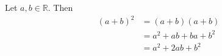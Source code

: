 Let $a, b \in \mathbb{R}$.
Then
\begin{align*}
  (a + b)^{2} &= (a + b)(a + b) \tag*{definition} \\
  &= a^{2} + ab + ba + b^{2} \tag*{distributivity} \\
  &= a^{2} + 2ab + b^{2} \tag*{commutativity}
\end{align*}